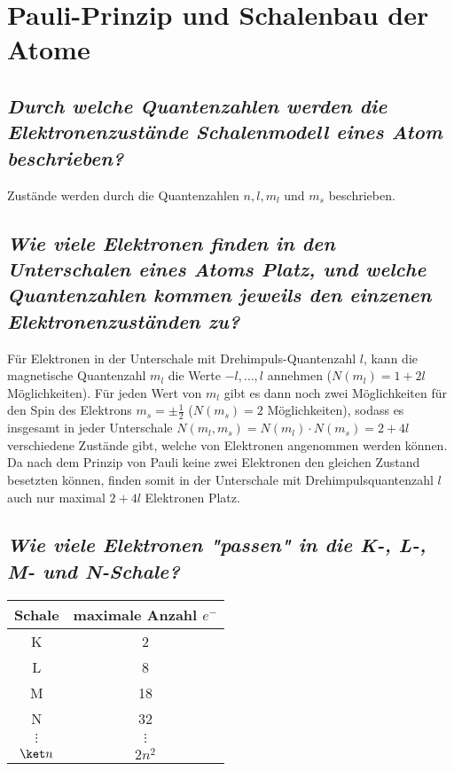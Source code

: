 \documentclass[ex, minted]{exercise_4.0}
\begin{document}
\section{Pauli-Prinzip und Schalenbau der Atome}
\subsection{\it Durch welche Quantenzahlen werden die Elektronenzustände Schalenmodell eines Atom beschrieben?}

\dottedlinett

Zustände werden durch die Quantenzahlen \(n,l,m_l\) und \(m_s\) beschrieben.

\subsection{\it Wie viele Elektronen finden in den Unterschalen eines Atoms Platz, und welche Quantenzahlen kommen jeweils den einzenen Elektronenzuständen zu?}

\dottedlinett

Für Elektronen in der Unterschale mit Drehimpuls-Quantenzahl \(l\), kann die magnetische Quantenzahl \(m_l\) die Werte \(-l,\dots, l\) annehmen (\(N(m_l)=1+2l\) Möglichkeiten). Für jeden Wert von \(m_l\) gibt es dann noch zwei Möglichkeiten für den Spin des Elektrons \(m_s=\pm \frac12\) ($N(m_s)=2$ Möglichkeiten), sodass es insgesamt in jeder Unterschale \(N(m_l,m_s) = N(m_l)\cdot N(m_s) = 2+4l\) verschiedene Zustände gibt, welche von Elektronen angenommen werden können. Da nach dem Prinzip von Pauli keine zwei Elektronen den gleichen Zustand besetzten können, finden somit in der Unterschale mit Drehimpulsquantenzahl \(l\) auch nur maximal \(2+4l\) Elektronen Platz.

\subsection{\it Wie viele Elektronen "{}passen"{} in die K-, L-, M- und N-Schale?}

\dottedlinett

\begin{center}
\begin{tabular}{|c|c|}
    \hline
    Schale & maximale Anzahl \(e^-\) \\\hline
    K & 2 \\\hline
    L & 8 \\\hline
    M & 18 \\\hline
    N & 32 \\\hline
    \(\vdots\) & \(\vdots\)\\\hline
    \(\ket n\) & \(2n^2\)\\\hline
\end{tabular}
\end{center}
\end{document}
